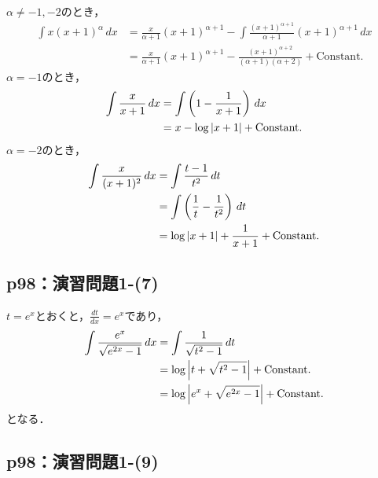 \documentclass[uplatex,dvipdfmx,a4paper,10pt,fleqn]{jsarticle}
\newenvironment{tleftbar}{\begin{tbleftline}\setlength{\parindent}{1zw}}{\end{tbleftline}}
\begin{document}
\begin{tleftbar}
    $\alpha \ne -1 , -2$のとき，
    \begin{align*} 
        \int x (x+1)^{\alpha} \, dx & = \frac{x}{\alpha +1} (x+1)^{\alpha+1} -\int \frac{(x+1)^{\alpha+1}}{\alpha +1} (x+1)^{\alpha+1} \, dx \\
        & = \frac{x}{\alpha +1} (x+1)^{\alpha+1} - \frac{(x+1)^{\alpha +2}}{(\alpha+1)(\alpha+2)}+ \mathrm{Constant.}
    \end{align*}
    $\alpha =-1$のとき，
    \begin{align*} 
        \int \frac{x}{x+1} \, dx & = \int \left ( 1 - \frac{1}{x+1} \right) \, dx \\
        & = x - \log \abs{x+1} + \mathrm{Constant.}
    \end{align*} 
    $ \alpha = -2$のとき，
    \begin{align*} 
        \int \frac{x}{(x+1)^2} \, dx & = \int \frac{t-1}{t^2} \, dt \\
        & = \int \left (\frac{1}{t}-\frac{1}{t^2} \right) \, dt \\
        & = \log \abs{x+1} +\frac{1}{x+1} + \mathrm{Constant.} 
    \end{align*} 
\end{tleftbar}


\subsection*{p98：演習問題1-(7)}

\begin{tleftbar}
    $ t = e^x$とおくと，$\frac{dt}{dx}=e^x$であり，
    \begin{align*} 
        \int \frac{e^x}{\sqrt{e^{2x}-1}} \, dx & = \int \frac{1}{\sqrt{t^2-1}} \, dt \\
        & = \log \abs{t+\sqrt{t^2-1}} + \mathrm{Constant.} \\
        & = \log \abs{e^x +\sqrt{e^{2x}-1}}+\mathrm{Constant.}
    \end{align*} 
    となる．
\end{tleftbar}



\subsection*{p98：演習問題1-(9)}
\end{document}
